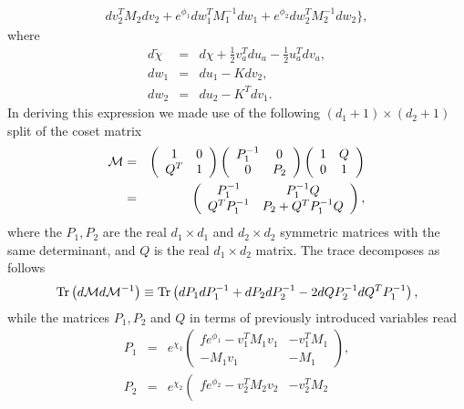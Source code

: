 \documentclass[a4paper,12pt]{article}
\def\Tr{{\rm Tr}}
\begin{document}
\begin{appendix}
\begin{eqnarray}
dv_2^T M_2 dv_2 + e^{\phi_1} dw_1^T M_1^{-1} dw_1 + e^{\phi_2}
dw_2^T M_2^{-1} dw_2 \Bigr\}, \nonumber
\end{eqnarray}
where
\begin{eqnarray}
d \tilde \chi &=& d \chi + \frac12 v_a^T d u_a - \frac12 u_a^T d
v_a, \\
d w_1 &=&  d u_1 - K d v_2, \\
d w_2 &=& d u_2 - K^T d v_1.
\end{eqnarray}
In deriving this expression we made use of the following
$(d_1+1)\times (d_2+1)$ split of the coset matrix
\begin{eqnarray}\label{M2}
{\cal M} &=&
  \left(\begin{array}{cc} 1 & 0 \\ Q^T & 1 \end{array} \right)
  \left(\begin{array}{cc} P_1^{-1} & 0 \\ 0 & P_2 \end{array}\right)
  \left(\begin{array}{cc} 1 & Q \\ 0 & 1 \end{array} \right)
  \nonumber \\
&=& \left( \begin{array}{cc}
  P_1^{-1}     & P_1^{-1} Q \\
  Q^T P_1^{-1} & P_2 + Q^T P_1^{-1} Q
  \end{array} \right),
\end{eqnarray}
where the $P_1, P_2$ are the real $d_1 \times d_1$ and $d_2\times
d_2$ symmetric matrices with the same determinant, and $Q$ is the
real $d_1\times d_2$ matrix. The trace decomposes as follows
\begin{equation}
\Tr \left( d {\cal M} d {\cal M}^{-1} \right) \equiv \Tr \left(
dP_1 dP_1^{-1} + dP_2 dP_2^{-1} - 2 dQ P_2^{-1} dQ^T P_1^{-1}
\right),
\end{equation}
while the matrices $P_1, P_2$ and $Q$ in terms of previously
introduced variables read
\begin{eqnarray}
P_1 &=& e^{\chi_1} \left( \begin{array}{cc}
  f e^{\phi_1} - v_1^T M_1 v_1 & -v_1^T M_1 \\
  -M_1 v_1                     & -M_1
  \end{array} \right), \nonumber\\
P_2 &=& e^{\chi_2} \left( \begin{array}{cc}
  f e^{\phi_2} - v_2^T M_2 v_2 & -v_2^T M_2 \\

\end{array}
\end{eqnarray}
\end{appendix}
\end{document}
